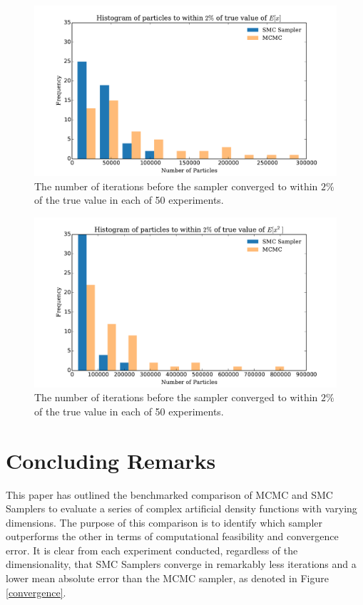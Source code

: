 \documentclass[12pt]{elsarticle}
\begin{document}
\begin{figure}[htbp]
\begin{center}
\includegraphics[width = \textwidth]{plots/iterations.pdf}
\caption{The number of iterations before the sampler converged to within $2\%$ of the true value in each of 50 experiments.}
\label{fig:itersEX}
\end{center}
\end{figure}

\begin{figure}[htbp]
\begin{center}
\includegraphics[width = \textwidth]{plots/iterationsEx2.pdf}
\caption{The number of iterations before the sampler converged to within $2\%$ of the true value in each of 50 experiments.}
\label{ig:itersEX2}
\end{center}
\end{figure}



\section*{Concluding Remarks}
This paper has outlined the benchmarked comparison of MCMC and SMC Samplers to evaluate a series of complex artificial density functions with varying dimensions. The purpose of this comparison is to identify which sampler outperforms the other in terms of computational feasibility and convergence error. It is clear from each experiment conducted, regardless of the dimensionality, that SMC Samplers converge in remarkably less iterations and a lower mean absolute error than the MCMC sampler, as denoted in Figure \ref{convergence}. \\
\end{document}
